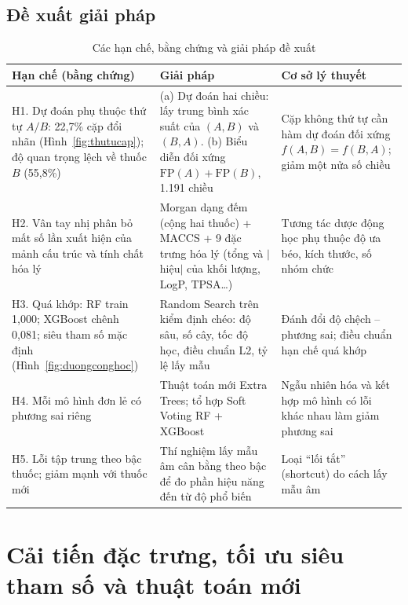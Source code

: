 \documentclass[12pt,a4paper,oneside]{report}
\begin{document}
\subsection{Đề xuất giải pháp}

\begin{table}[H]
  \centering
  \caption{Các hạn chế, bằng chứng và giải pháp đề xuất}
  \label{tab:hanche}
  \small
  \begin{tabularx}{\textwidth}{>{\raggedright\arraybackslash}p{4.2cm} >{\raggedright\arraybackslash}X >{\raggedright\arraybackslash}p{4.3cm}}
    \toprule
    \textbf{Hạn chế (bằng chứng)} & \textbf{Giải pháp} & \textbf{Cơ sở lý thuyết} \\
    \midrule
    H1. Dự đoán phụ thuộc thứ tự $A/B$: 22,7\% cặp đổi nhãn (Hình~\ref{fig:thutucap}); độ quan trọng lệch về thuốc $B$ (55,8\%) &
      (a) Dự đoán hai chiều: lấy trung bình xác suất của $(A,B)$ và $(B,A)$. (b) Biểu diễn đối xứng $\mathrm{FP}(A)+\mathrm{FP}(B)$, 1.191 chiều &
      Cặp không thứ tự cần hàm dự đoán đối xứng $f(A,B)=f(B,A)$; giảm một nửa số chiều \\
    H2. Vân tay nhị phân bỏ mất số lần xuất hiện của mảnh cấu trúc và tính chất hóa lý &
      Morgan dạng đếm (cộng hai thuốc) + MACCS + 9 đặc trưng hóa lý (tổng và $|$hiệu$|$ của khối lượng, LogP, TPSA\dots) &
      Tương tác dược động học phụ thuộc độ ưa béo, kích thước, số nhóm chức \\
    H3. Quá khớp: RF train 1,000; XGBoost chênh 0,081; siêu tham số mặc định (Hình~\ref{fig:duongconghoc}) &
      Random Search trên kiểm định chéo: độ sâu, số cây, tốc độ học, điều chuẩn L2, tỷ lệ lấy mẫu &
      Đánh đổi độ chệch -- phương sai; điều chuẩn hạn chế quá khớp \\
    H4. Mỗi mô hình đơn lẻ có phương sai riêng &
      Thuật toán mới Extra Trees; tổ hợp Soft Voting RF + XGBoost &
      Ngẫu nhiên hóa và kết hợp mô hình có lỗi khác nhau làm giảm phương sai \\
    H5. Lỗi tập trung theo bậc thuốc; giảm mạnh với thuốc mới &
      Thí nghiệm lấy mẫu âm cân bằng theo bậc để đo phần hiệu năng đến từ độ phổ biến &
      Loại ``lối tắt'' (shortcut) do cách lấy mẫu âm \\
    \bottomrule
  \end{tabularx}
\end{table}

\section{Cải tiến đặc trưng, tối ưu siêu tham số và thuật toán mới}
\label{sec:caitien}
\end{document}
